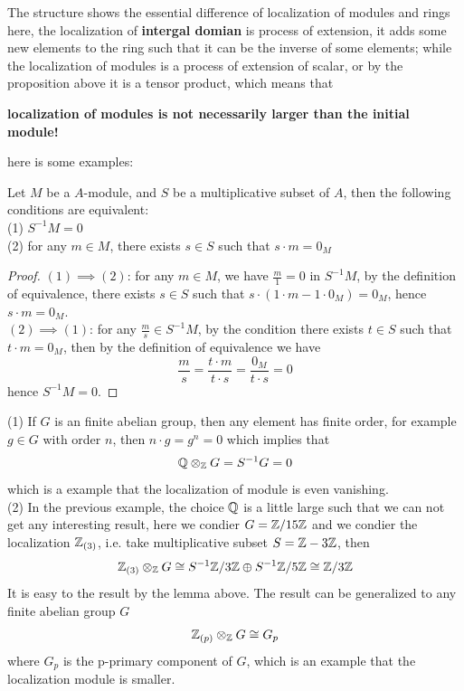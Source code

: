 \documentclass[12pt,a4paper]{article}
\begin{document}
    The structure shows the essential difference of localization of modules and rings here, the localization of \textbf{intergal domian} is process of extension, it adds some new elements to the ring such that it can be the inverse of some elements; while the localization of modules is a process of extension of scalar, or by the proposition above it is a tensor product, which means that 
    \begin{center}
        \textbf{localization of modules is not necessarily larger than the initial module!}
    \end{center}
    here is some examples:




    
    \begin{lemma}
        Let \(M\) be a \(A\)-module, and \(S\) be a multiplicative subset of \(A\), then the following conditions are equivalent:\\
        (1) \(S^{-1}M = 0\)\\
        (2) for any \(m \in M\), there exists \(s \in S\) such that \(s \cdot m = 0_M\)

        \begin{proof}
            \((1) \implies (2)\): for any \(m \in M\), we have \(\frac{m}{1} = 0\) in \(S^{-1}M\), by the definition of equivalence, there exists \(s \in S\) such that \(s \cdot (1\cdot m - 1 \cdot 0_M) = 0_M\), hence \(s \cdot m = 0_M\).\\

            \((2) \implies (1)\): for any \(\frac{m}{s} \in S^{-1}M\), by the condition there exists \(t \in S\) such that \(t \cdot m = 0_M\), then by the definition of equivalence we have
            \[\frac{m}{s} = \frac{t \cdot m}{t \cdot s} = \frac{0_M}{t \cdot s} = 0\]
            hence \(S^{-1}M = 0\).
        \end{proof}
    \end{lemma}

    (1) If \(G\) is an finite abelian group, then any element has finite order, for example \(g \in G\) with order \(n\), then \(n\cdot g = g^n = 0\) which implies that 
    \[\mathbb{Q} \otimes_{\mathbb{Z}}G = S^{-1}G = 0\]
    which is a example that the localization of module is even vanishing.\\

    (2) In the previous example, the choice \(\mathbb{Q}\) is a little large such that we can not get any interesting result, here we condier \(G = \mathbb{Z}/15\mathbb{Z}\) and we condier the localization \(\mathbb{Z}_{(3)}\), i.e. take multiplicative subset \(S = \mathbb{Z} - 3\mathbb{Z}\), then
    \[\mathbb{Z}_{(3)} \otimes_{\mathbb{Z}} G \cong S^{-1}\mathbb{Z}/3\mathbb{Z} \oplus S^{-1}\mathbb{Z}/5\mathbb{Z} \cong \mathbb{Z}/3\mathbb{Z}\]
    It is easy to the result by the lemma above. The result can be generalized to any finite abelian group \(G\)
    \[\mathbb{Z}_{(p)} \otimes_{\mathbb{Z}} G \cong G_p\]
    where \(G_p\) is the p-primary component of \(G\), which is an example that the localization module is smaller.\\
\end{document}
